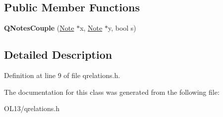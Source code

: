 \subsection*{Public Member Functions}
\begin{DoxyCompactItemize}
\item 
\mbox{\label{class_q_notes_couple_a010fab55fb622f8959510ad50ff34502}} 
{\bfseries Q\+Notes\+Couple} (\hyperlink{class_note}{Note} $\ast$x, \hyperlink{class_note}{Note} $\ast$y, bool s)
\end{DoxyCompactItemize}


\subsection{Detailed Description}


Definition at line 9 of file qrelations.\+h.



The documentation for this class was generated from the following file\+:\begin{DoxyCompactItemize}
\item 
O\+L13/qrelations.\+h\end{DoxyCompactItemize}
